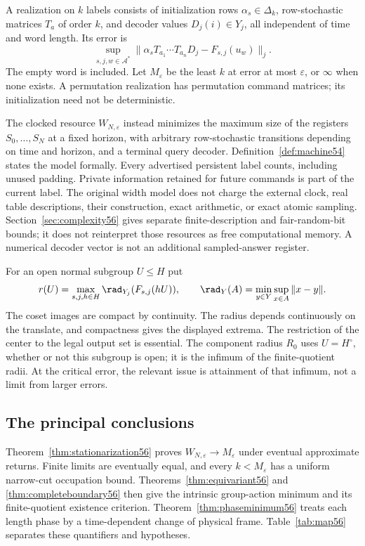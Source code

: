 \begin{definition}\label{def:stationary55}
A realization on $k$ labels consists of initialization rows $\alpha_s\in\Delta_k$, row-stochastic matrices $T_a$ of order $k$, and decoder values $D_j(i)\in Y_j$, all independent of time and word length. Its error is
\[
       \sup_{s,j,w\in\mathcal A^*}
        \|\alpha_sT_{a_1}\cdots T_{a_n}D_j-F_{s,j}(u_w)\|_j.
\]
The empty word is included. Let $M_\varepsilon$ be the least $k$ at error at most $\varepsilon$, or $\infty$ when none exists. A permutation realization has permutation command matrices; its initialization need not be deterministic.
\end{definition}
The clocked resource $W_{N,\varepsilon}$ instead minimizes the maximum size of the registers $S_0,\ldots,S_N$ at a fixed horizon, with arbitrary row-stochastic transitions depending on time and horizon, and a terminal query decoder. Definition~\ref{def:machine54} states the model formally. Every advertised persistent label counts, including unused padding. Private information retained for future commands is part of the current label. The original width model does not charge the external clock, real table descriptions, their construction, exact arithmetic, or exact atomic sampling. Section~\ref{sec:complexity56} gives separate finite-description and fair-random-bit bounds; it does not reinterpret those resources as free computational memory. A numerical decoder vector is not an additional sampled-answer register.

For an open normal subgroup $U\le H$ put
\begin{equation}\label{eq:quotientradius55}
 r(U)=\max_{s,j,h\in H}\rad_{Y_j}(F_{s,j}(hU)),
 \qquad\rad_Y(A)=\min_{y\in Y}\sup_{x\in A}\|x-y\|.
\end{equation}
The coset images are compact by continuity. The radius depends continuously on the translate, and compactness gives the displayed extrema. The restriction of the center to the legal output set is essential. The component radius $R_0$ uses $U=H^\circ$, whether or not this subgroup is open; it is the infimum of the finite-quotient radii. At the critical error, the relevant issue is attainment of that infimum, not a limit from larger errors.

\subsection{The principal conclusions}
Theorem~\ref{thm:stationarization56} proves $W_{N,\varepsilon}\to M_\varepsilon$ under eventual approximate returns. Finite limits are eventually equal, and every $k<M_\varepsilon$ has a uniform narrow-cut occupation bound. Theorems~\ref{thm:equivariant56} and \ref{thm:completeboundary56} then give the intrinsic group-action minimum and its finite-quotient existence criterion. Theorem~\ref{thm:phaseminimum56} treats each length phase by a time-dependent change of physical frame. Table~\ref{tab:map56} separates these quantifiers and hypotheses.

